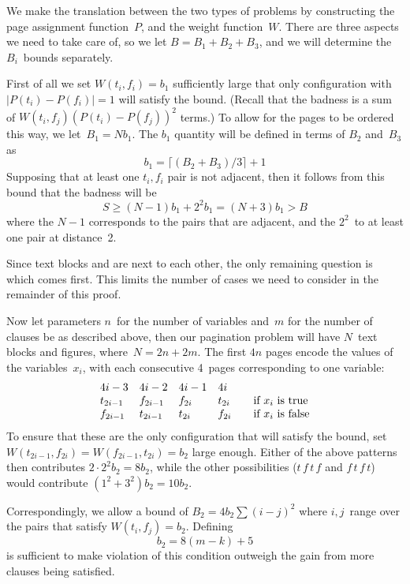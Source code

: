 We make the translation between the two types of problems by
constructing the page assignment function~$P$, and the weight
function~$W$. There are three aspects we need to take care of, so we
let $B=B_1+B_2+B_3$, and we will determine the $B_i$~bounds
separately.

First of all we set $W(t_i,f_i)=b_1$ sufficiently large that only
configuration with $|P(t_i)-P(f_i)|=1$ will satisfy the bound. (Recall
that the badness is a sum of $W(t_i,f_j)(P(t_i)-P(f_j))^2$ terms.)
To allow for the pages to be ordered this way, we
let~$B_1=Nb_1$. The $b_1$ quantity will be defined in terms of
$B_2$ and~$B_3$ as
\[ b_1 = \lceil (B_2+B_3)/3\rceil+1 \]
Supposing that at least one $t_i,f_i$ pair is not adjacent, then it
follows from this bound that the badness will be
\[ S\geq (N-1)b_1+2^2b_1=(N+3)b_1>B \]
where the $N-1$ corresponds to the pairs that are adjacent, and the
$2^2$~to at least one pair at distance~2.

Since
text blocks and are next to each other, the only remaining question is
which comes first. This limits the number of cases we need to consider
in the remainder of this proof.

Now let parameters $n$~for the number of variables and~$m$ for the
number of clauses be as described above, then our pagination problem
will have $N$~text blocks and figures, where~$N=2n+2m$.  The first
$4n$ pages encode the values of the variables~$x_i$, with each
consecutive 4~pages corresponding to one variable:
\[ \begin{array}{lllll}
4i-3&4i-2&4i-1&4i\\
t_{2i-1}&f_{2i-1}&f_{2i}&t_{2i}&\quad\hbox{if $x_i$ is true}\\
f_{2i-1}&t_{2i-1}&t_{2i}&f_{2i}&\quad\hbox{if $x_i$ is false}
\end{array}
\]
To ensure that these are the only configuration that will satisfy the
bound, set $W(t_{2i-1},f_{2i})=W(f_{2i-1},t_{2i})=b_2$ large enough.
Either of the above patterns then contributes $2\cdot 2^2b_2=8b_2$, while
the other possibilities ($t\,f\,t\,f$ and $f\,t\,f\,t$) would
contribute $(1^2+3^2)b_2=10b_2$.

Correspondingly, we allow a bound of $B_2=4b_2\sum(i-j)^2$ where
$i,j$~range over the pairs that satisfy $W(t_i,f_j)=b_2$.  Defining 
\[ b_2=8(m-k)+5 \]
is sufficient to make violation of this condition
outweigh the gain from more clauses being satisfied.

